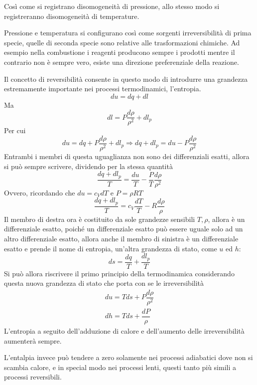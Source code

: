 \begin{adjustwidth}{2in}{}
	Così come si registrano disomogeneità di pressione, allo stesso modo si registreranno disomogeneità di temperature. \newline
	
	Pressione e temperatura si configurano così come sorgenti irreversibilità di prima specie, quelle di seconda specie sono relative alle trasformazioni chimiche. Ad esempio nella combustione i reagenti producono sempre i prodotti mentre il contrario non è sempre vero, esiste una direzione preferenziale della reazione.\newline
	
	Il concetto di reversibilità consente in questo modo di introdurre una grandezza estremamente importante nei processi termodinamici, l'entropia. 	
	\[du = dq + dl\]
	Ma
	\[dl = P\dfrac{d\rho}{\rho^2} + dl_p\]
	Per cui 
	\[du = dq + P\dfrac{d\rho}{\rho^2} + dl_p \Rightarrow dq + dl_p = du -P\dfrac{d\rho}{\rho^2}\] 
	Entrambi i membri di questa uguaglianza non sono dei differenziali esatti, allora si può sempre scrivere, dividendo per la stessa quantità 
	\[\dfrac{dq + dl_p}{T} = \dfrac{du}{T} -\dfrac{P}{T}\dfrac{d\rho}{\rho^2}\]
	Ovvero, ricordando che $du=c_VdT$ e $P=\rho RT$
	\[\dfrac{dq + dl_p}{T} = c_V\dfrac{dT}{T} -R\dfrac{d\rho}{\rho}\] 
	Il membro di destra ora è costituito da sole grandezze sensibili $T, \rho$, allora è un differenziale esatto, poiché un differenziale esatto può essere uguale solo ad un altro differenziale esatto, allora anche il membro di sinistra è un differenziale esatto e prende il nome di entropia, un'altra grandezza di stato, come $u$ ed $h$:
	\begin{equation}\label{eq:1.11}
		ds = \dfrac{dq}{T} + \dfrac{dl_p}{T}
	\end{equation}
	Si può allora riscrivere il primo principio della termodinamica considerando questa nuova grandezza di stato che porta con se le irreversibilità
	\begin{eqnarray}\label{eq:1.12} \label{eq:1.13}
	\boxed{du = Tds + P\dfrac{d\rho}{\rho^2}}\\
	\boxed{dh = Tds + \dfrac{dP}{\rho}}
	\end{eqnarray}
	L'entropia a seguito dell'adduzione di calore e dell'aumento delle irreversibilità aumenterà sempre. 
	
	L'entalpia invece può tendere a zero solamente nei processi adiabatici dove non si scambia calore, e in special modo nei processi lenti, questi tanto più simili a processi reversibili. 
	

\end{adjustwidth}
